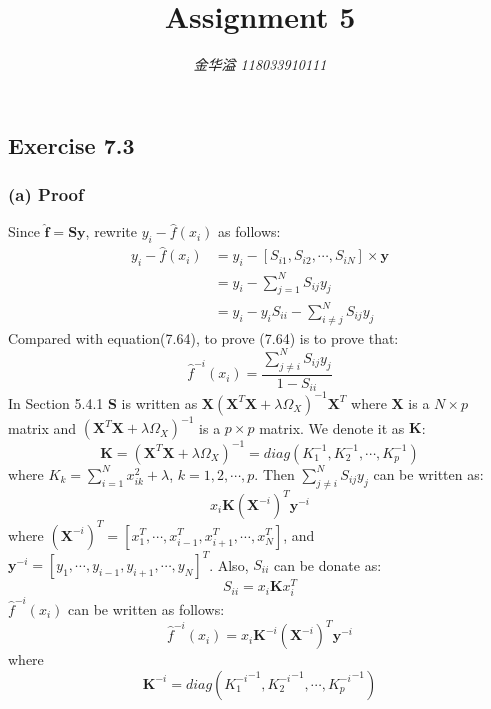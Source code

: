 \documentclass[12pt]{article}
\title{\LARGE\bf{Assignment 5}}
\author{\Large\textit{金华溢 118033910111}}
\def\mbf#1{\mathbf{#1}}
\begin{document}
\maketitle
\subsection* {Exercise 7.3}
\subsubsection* {(a) Proof}
Since $\mbf{\hat{f}}=\mbf{Sy}$, rewrite $y_i-\hat{f}(x_i)$ as follows:
\begin{align*}
    y_i-\hat{f}(x_i)&=y_i-[S_{i1},S_{i2},\cdots,S_{iN}] \times \mbf{y} \\
    &=y_i - \sum\limits_{j=1}^N S_{ij}y_j \\
    &=y_i-y_iS_{ii} -\sum\limits_{i\neq j}^N S_{ij}y_j
\end{align*}
Compared with equation(7.64), to prove (7.64) is to prove that:
\begin{equation}
    \hat{f}^{-i}(x_i) = \frac{\sum\limits_{j\neq i}^N S_{ij}y_j}{1-S_{ii}}
\end{equation}
In Section 5.4.1 \textbf{S} is written as
$\mbf{X}(\mbf{X}^T\mbf{X} + \lambda\Omega_X)^{-1}\mbf{X}^T$
where $\mbf{X}$ is a $N\times p$ matrix and 
$(\mbf{X}^T\mbf{X} + \lambda\Omega_X)^{-1}$
is a $p\times p$ matrix. We denote it as $\mbf{K}$:
\begin{equation}
    \mbf{K}=(\mbf{X}^T\mbf{X} + \lambda\Omega_X)^{-1}
    =diag(K_1^{-1},K_2^{-1},\cdots,K_p^{-1})
\end{equation}
where $K_k = \sum_{i=1}^{N}x_{ik}^2+\lambda$, $k=1,2,\cdots,p$. 
Then $\sum\limits_{j\neq i}^N S_{ij}y_j$ can be written as:
\begin{equation}
    x_i\mbf{K}(\mbf{X}^{-i})^T \mbf{y}^{-i}
\end{equation}
where $(\mbf{X}^{-i})^T = \left[x_1^T,\cdots,x_{i-1}^T,x_{i+1}^T,\cdots,x_N^T\right]$, and
$\mathbf{y}^{-i} = \left[y_1 ,\cdots ,y_{i-1},y_{i+1},\cdots,y_N\right]^T$. 
Also, $S_{ii}$ can be donate as:
\begin{equation}
    S_{ii}=x_i\mbf{K}x_i^T
\end{equation}
$\hat{f}^{-i}(x_i)$ can be written as follows:
\begin{equation}
    \hat{f}^{-i}(x_i) = x_i\mbf{K}^{-i} (\mbf{X}^{-i})^T \mbf{y}^{-i}
\end{equation}
where
\begin{equation}
    \mbf{K}^{-i} = diag({K_1^{-i}}^{-1},{K_2^{-i}}^{-1},\cdots,{K_p^{-i}}^{-1})
\end{equation}
\end{document}
